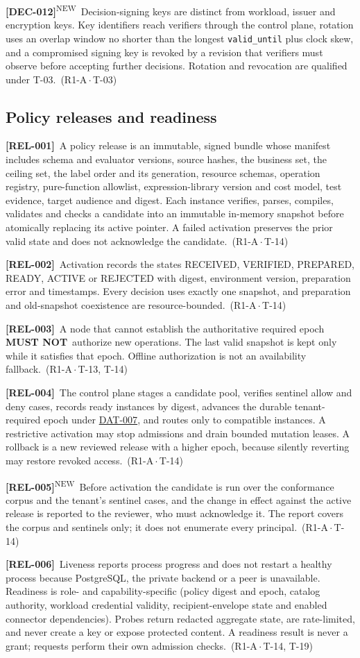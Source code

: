 \documentclass[11pt,a4paper]{article}
\newcommand{\mustnot}{\textbf{MUST NOT}}
\newcommand{\code}[1]{{\small\nolinkurl{#1}}}
\newcommand{\rr}[1]{\hyperlink{req:#1}{#1}}
\newcommand{\reqtag}[2]{{\footnotesize\color{accent}(#1\,$\cdot$\,#2)}}
\newcommand{\req}[4]{\par\noindent\hypertarget{req:#1}{\textbf{[#1]}}\ #4\ \reqtag{#2}{#3}\par}
\newcommand{\reqn}[4]{\par\noindent\hypertarget{req:#1}{\textbf{[#1]}}\textsuperscript{\color{accent}\tiny NEW}\ #4\ \reqtag{#2}{#3}\par}
\begin{document}
\reqn{DEC-012}{R1-A}{T-03}{Decision-signing keys are distinct from workload, issuer and encryption keys. Key identifiers reach verifiers through the control plane, rotation uses an overlap window no shorter than the longest \code{valid_until} plus clock skew, and a compromised signing key is revoked by a revision that verifiers must observe before accepting further decisions. Rotation and revocation are qualified under T-03.}

\subsection{Policy releases and readiness}
\req{REL-001}{R1-A}{T-14}{A policy release is an immutable, signed bundle whose manifest includes schema and evaluator versions, source hashes, the business set, the ceiling set, the label order and its generation, resource schemas, operation registry, pure-function allowlist, expression-library version and cost model, test evidence, target audience and digest. Each instance verifies, parses, compiles, validates and checks a candidate into an immutable in-memory snapshot before atomically replacing its active pointer. A failed activation preserves the prior valid state and does not acknowledge the candidate.}
\req{REL-002}{R1-A}{T-14}{Activation records the states RECEIVED, VERIFIED, PREPARED, READY, ACTIVE or REJECTED with digest, environment version, preparation error and timestamps. Every decision uses exactly one snapshot, and preparation and old-snapshot coexistence are resource-bounded.}
\req{REL-003}{R1-A}{T-13, T-14}{A node that cannot establish the authoritative required epoch \mustnot\ authorize new operations. The last valid snapshot is kept only while it satisfies that epoch. Offline authorization is not an availability fallback.}
\req{REL-004}{R1-A}{T-14}{The control plane stages a candidate pool, verifies sentinel allow and deny cases, records ready instances by digest, advances the durable tenant-required epoch under \rr{DAT-007}, and routes only to compatible instances. A restrictive activation may stop admissions and drain bounded mutation leases. A rollback is a new reviewed release with a higher epoch, because silently reverting may restore revoked access.}
\reqn{REL-005}{R1-A}{T-14}{Before activation the candidate is run over the conformance corpus and the tenant's sentinel cases, and the change in effect against the active release is reported to the reviewer, who must acknowledge it. The report covers the corpus and sentinels only; it does not enumerate every principal.}
\req{REL-006}{R1-A}{T-14, T-19}{Liveness reports process progress and does not restart a healthy process because PostgreSQL, the private backend or a peer is unavailable. Readiness is role- and capability-specific (policy digest and epoch, catalog authority, workload credential validity, recipient-envelope state and enabled connector dependencies). Probes return redacted aggregate state, are rate-limited, and never create a key or expose protected content. A readiness result is never a grant; requests perform their own admission checks.}
\end{document}
